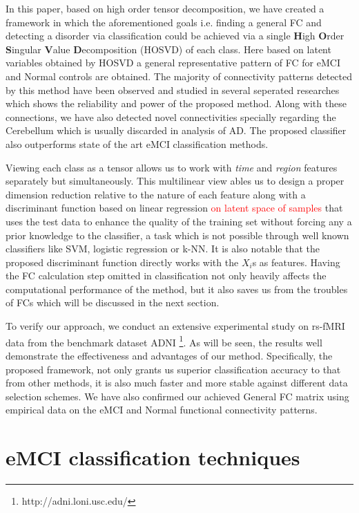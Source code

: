 \documentclass[preprint,12pt]{elsarticle}
\begin{document}
						
	In this paper, based on high order tensor decomposition, we have created a framework in which the aforementioned goals i.e. finding a general FC and detecting a disorder via classification could be achieved via a single \textbf{H}igh \textbf{O}rder \textbf{S}ingular \textbf{V}alue \textbf{D}ecomposition (HOSVD) of each class.
	 Here based on latent variables obtained by HOSVD a general representative pattern of FC for eMCI and Normal controls are obtained. 
	 The majority of connectivity patterns detected by this method have been observed and studied in several seperated researches which shows the reliability and power of the proposed method. Along with these connections, we have also detected novel connectivities specially regarding the Cerebellum which is usually discarded in analysis of AD.     
	 The proposed classifier also outperforms state of the art eMCI classification methods. 
	 
	 Viewing each class as a tensor allows us to work with \textit{time} and \textit{region} features separately but simultaneously. This multilinear view
	  ables us to design a proper dimension reduction relative to the nature of each feature along with a discriminant function based on linear regression \textcolor{red}{on latent space of samples} that uses the test data to enhance the quality of the training set without forcing any a prior knowledge to the classifier, a task which is not possible through well known classifiers like SVM, logistic regression or k-NN. It is also notable that the proposed discriminant function directly works with the $X_i$s as features. Having the FC calculation step omitted in classification not only heavily affects the computational performance of the method, but it also saves us from the troubles of FCs which will be discussed in the next section.   
	  
	  To verify our approach, we conduct an extensive experimental study on rs-fMRI data from the
	  	benchmark dataset ADNI
	  	\footnote{http://adni.loni.usc.edu/}.
	  	As will be seen, the results well demonstrate the effectiveness and advantages of our method. Specifically, the proposed framework, not only grants us superior classification accuracy to that from other methods, it is also much faster and more stable against different data selection schemes. We have also confirmed our achieved General FC matrix using empirical data on the eMCI and Normal functional connectivity patterns.
	  	
							 
	\section{eMCI classification techniques}
\end{document}

